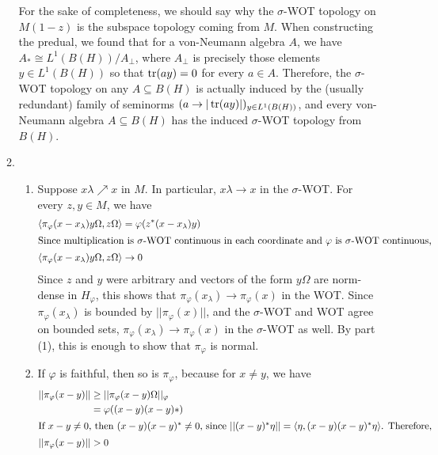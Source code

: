 \documentclass[a4paper,10pt]{report}
\newcommand{\ggen}[1]{\langle#1\rangle}
\newcommand{\pn}[2]{||#1||_{#2}}
\newcommand{\norm}[1]{||#1||}
\begin{document}
\begin{enumerate}
\begin{enumerate}
				For the sake of completeness, we should say why the $\sigma$-WOT topology on $M(1-z)$ is the subspace topology coming from $M$. When constructing the predual, we found that for a von-Neumann algebra $A$, we have $A_*\cong L^1(B(H))/A_\perp$, where $A_\perp$ is precisely those elements $y\in L^1(B(H))$ so that $\operatorname{tr}(ay)=0$ for every $a\in A$. Therefore, the $\sigma$-WOT topology on any $A\subseteq B(H)$ is actually induced by the (usually redundant) family of seminorms ${(a\to |\operatorname{tr}(ay)|)_{y\in L^1(B(H))}}$, and every von-Neumann algebra $A\subseteq B(H)$ has the induced $\sigma$-WOT topology from $B(H)$. %
			\item 
				\begin{enumerate}
					\item Suppose $x\lambda\nearrow x$ in $M$. In particular, $x\lambda\to x$ in the $\sigma$-WOT. For every $z,y\in M$, we have 
						\begin{align*}
							\ggen{\pi_\varphi(x-x_\lambda)y\Omega,z\Omega} &= \varphi(z^*(x-x_\lambda)y)\\
							\intertext{Since multiplication is $\sigma$-WOT continuous in each coordinate and $\varphi$ is $\sigma$-WOT continuous, }
							\ggen{\pi_\varphi(x-x_\lambda)y\Omega,z\Omega}&\to 0
						\end{align*}
							Since $z$ and $y$ were arbitrary and vectors of the form $y\Omega$ are norm-dense in $H_\varphi$, this shows that $\pi_\varphi(x_\lambda)\to\pi_\varphi(x)$ in the WOT. 
							Since $\pi_\varphi(x_\lambda)$ is bounded by $\norm{\pi_\varphi(x)}$, and the $\sigma$-WOT and WOT agree on bounded sets, $\pi_\varphi(x_\lambda)\to\pi_\varphi(x)$ in the $\sigma$-WOT as well. %
							By part (1), this is enough to show that $\pi_\varphi$ is normal. 
						\item If $\varphi$ is faithful, then so is $\pi_\varphi$, because for $x\neq y$, we have 
							\begin{align*}
								\norm{\pi_\varphi(x-y)} &\ge \pn{\pi_\varphi(x-y)\Omega}{\varphi}\\
								&= \varphi((x-y)(x-y)*)\\
								\intertext{If $x-y\neq 0$, then $(x-y)(x-y)^*\neq 0$, since $\norm{(x-y)^*\eta}=\ggen{\eta,(x-y)(x-y)^*\eta}$. Therefore, } %
								\norm{\pi_\varphi(x-y)} &> 0

\end{align*}
\end{enumerate}
\end{enumerate}
\end{enumerate}
\end{document}
